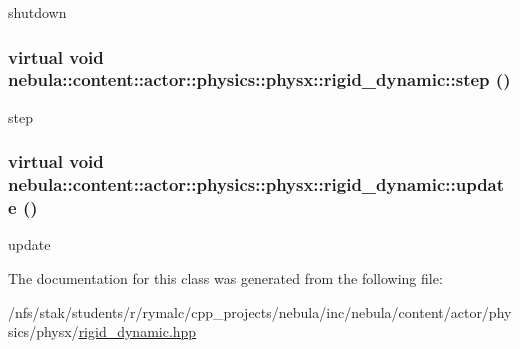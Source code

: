 shutdown \hypertarget{classnebula_1_1content_1_1actor_1_1physics_1_1physx_1_1rigid__dynamic_a0bd60393cb77edcb4597070dfba9bff4}{
\subsubsection[{step}]{\setlength{\rightskip}{0pt plus 5cm}virtual void nebula::content::actor::physics::physx::rigid\_\-dynamic::step ()}}
\label{classnebula_1_1content_1_1actor_1_1physics_1_1physx_1_1rigid__dynamic_a0bd60393cb77edcb4597070dfba9bff4}


step \hypertarget{classnebula_1_1content_1_1actor_1_1physics_1_1physx_1_1rigid__dynamic_a4687fa4b706a0adf0b733ff199bd0d25}{
\subsubsection[{update}]{\setlength{\rightskip}{0pt plus 5cm}virtual void nebula::content::actor::physics::physx::rigid\_\-dynamic::update ()}}
\label{classnebula_1_1content_1_1actor_1_1physics_1_1physx_1_1rigid__dynamic_a4687fa4b706a0adf0b733ff199bd0d25}


update 

The documentation for this class was generated from the following file:\begin{DoxyCompactItemize}
\item 
/nfs/stak/students/r/rymalc/cpp\_\-projects/nebula/inc/nebula/content/actor/physics/physx/\hyperlink{physics_2physx_2rigid__dynamic_8hpp}{rigid\_\-dynamic.hpp}\end{DoxyCompactItemize}
